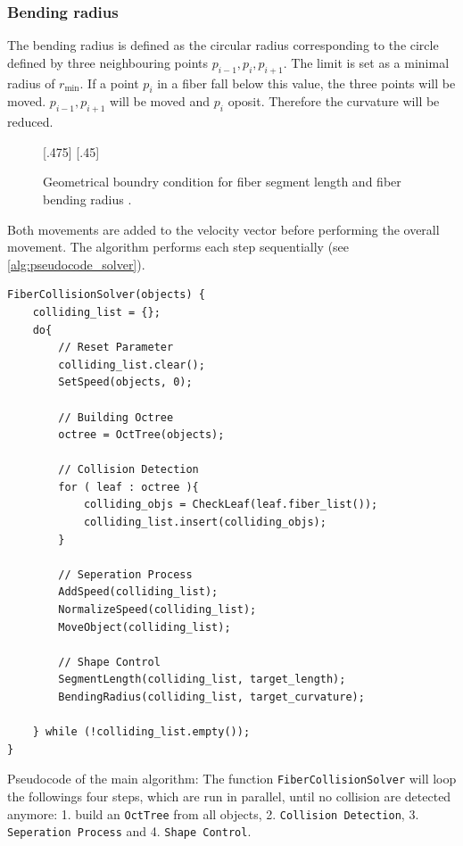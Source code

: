 \subsubsection{Bending radius}
% 
The bending radius is defined as the circular radius corresponding to the circle defined by three neighbouring points $p_{i-1}, p_{i}, p_{i+1}$. 
The limit is set as a minimal radius of $r_{\min}$.
If a point $p_{i}$ in a fiber fall below this value, the three points will be moved.
$p_{i-1},p_{i+1}$ will be moved \dummy and $p_{i}$ oposit.
Therefore the curvature will be reduced.
% 
% 
\begin{figure}[!t]
    \centering
    \def\tikzheight{.42\textwidth}
    [.475\textwidth]{
    }\hfill
    [.45\textwidth]{
    }
	\caption{Geometrical boundry condition for fiber segment length \segLength and fiber bending radius \segRadius.}
	\label{fig:model_circle_}
\end{figure}
% 
\newline
Both movements are added to the velocity vector before performing the overall movement.
The algorithm performs each step sequentially (see \cref{alg:pseudocode_solver}).
\begin{lstfloat}[!tb]
\lstset{style=cpp}

\begin{lstlisting}[]
FiberCollisionSolver(objects) {
	colliding_list = {};
	do{
		// Reset Parameter
		colliding_list.clear();
		SetSpeed(objects, 0);
		
		// Building Octree
		octree = OctTree(objects);
		
		// Collision Detection
		for ( leaf : octree ){
			colliding_objs = CheckLeaf(leaf.fiber_list());
			colliding_list.insert(colliding_objs);
		}
		
		// Seperation Process
		AddSpeed(colliding_list);
		NormalizeSpeed(colliding_list);
		MoveObject(colliding_list);
		
		// Shape Control
		SegmentLength(colliding_list, target_length);
		BendingRadius(colliding_list, target_curvature);
		
	} while (!colliding_list.empty());
}
\end{lstlisting}
\caption{Pseudocode of the main algorithm: The function \texttt{FiberCollisionSolver} will loop the followings four steps, which are run in parallel, until no collision are detected anymore: 1. build an \texttt{OctTree} from all objects, 2. \texttt{Collision Detection}, 3. \texttt{Seperation Process} and 4. \texttt{Shape Control}.}
\label{alg:pseudocode_solver}
\end{lstfloat}
